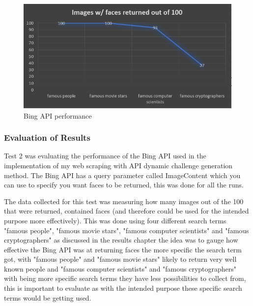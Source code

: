 \documentclass[12pt,a4paper]{article}
\begin{document}
\begin{figure}[!ht]
    \centering
    \includegraphics[width=1.0\textwidth]{Figs/bingev.PNG} 
    \caption{Bing API performance} 
    \label{bingev}
\end{figure}

\subsubsection{Evaluation of Results} 

Test 2 was evaluating the performance of the Bing API used in the implementation of my web scraping with API dynamic challenge generation method. The Bing API has a query parameter called ImageContent which you can use to specify you want faces to be returned, this was done for all the runs.

The data collected for this test was measuring how many images out of the 100 that were returned, contained faces (and therefore could be used for the intended purpose more effectively). This was done using four different search terms "famous people", "famous movie stars", "famous computer scientists" and "famous cryptographers" as discussed in the results chapter the idea was to gauge how effective the Bing API was at returning faces the more specific the search term got, with "famous people" and "famous movie stars" likely to return very well known people and "famous computer scientists" and "famous cryptographers" with being more specific search terms they have less possibilities to collect from, this is important to evaluate as with the intended purpose these specific search terms would be getting used.  
\end{document}
